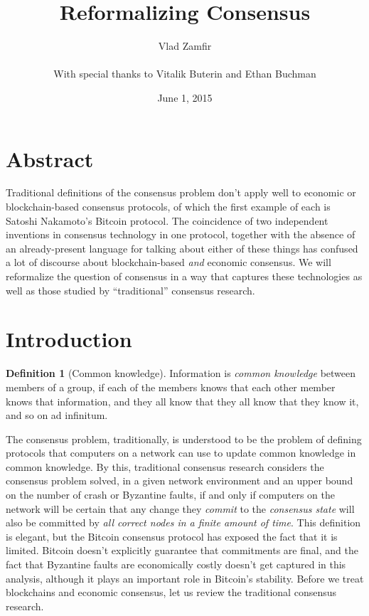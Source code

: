 \documentclass[11pt,a4paper]{article}
\title{Reformalizing Consensus}
\date{June 1, 2015}
\author{Vlad Zamfir\\
 			\\
 			\small With special thanks to Vitalik Buterin and Ethan Buchman}
\theoremstyle{plain}
\theoremstyle{definition}
\newtheorem{defn}{Definition}
\begin{document}
\maketitle
\tableofcontents


\section{Abstract}

Traditional definitions of the consensus problem don't apply well to economic or blockchain-based consensus protocols, of which the first example of each is Satoshi Nakamoto's Bitcoin protocol. The coincidence of two independent inventions in consensus technology in one protocol, together with the absence of an already-present language for talking about either of these things has confused a lot of discourse about blockchain-based \emph{and} economic consensus. We will reformalize the question of consensus in a way that captures these technologies as well as those studied by ``traditional'' consensus research.

\vspace{0.5cm}


\section{Introduction}

\begin{defn}[Common knowledge]
Information is \emph{common knowledge} between members of a group, if each of the members knows that each other member knows that information, and they all know that they all know that they know it, and so on ad infinitum.
\end{defn}

The consensus problem, traditionally, is understood to be the problem of defining protocols that computers on a network can use to update common knowledge in common knowledge. By this, traditional consensus research considers the consensus problem solved, in a given network environment and an upper bound on the number of crash or Byzantine faults, if and only if computers on the network will be certain that any change they \emph{commit} to the \emph{consensus state} will also be committed by \emph{all correct nodes in a finite amount of time}. This definition is elegant, but the Bitcoin consensus protocol has exposed the fact that it is limited. Bitcoin doesn't explicitly guarantee that commitments are final, and the fact that Byzantine faults are economically costly doesn't get captured in this analysis, although it plays an important role in Bitcoin's stability. Before we treat blockchains and economic consensus, let us review the traditional consensus research.
\end{document}
